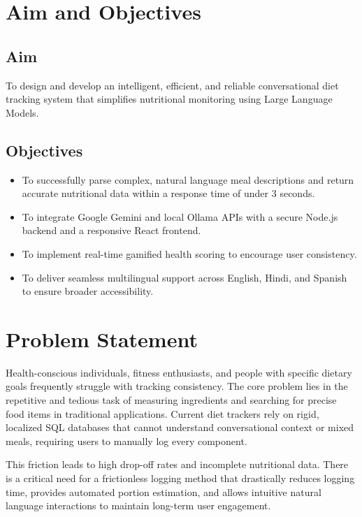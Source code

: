 \documentclass[12pt,a4paper]{report}
\begin{document}
\section{Aim and Objectives}

\subsection{Aim}
To design and develop an intelligent, efficient, and reliable conversational diet tracking system that simplifies nutritional monitoring using Large Language Models.

\subsection{Objectives}
\begin{itemize}[leftmargin=*]
    \item To successfully parse complex, natural language meal descriptions and return accurate nutritional data within a response time of under 3 seconds.
    \item To integrate Google Gemini and local Ollama APIs with a secure Node.js backend and a responsive React frontend.
    \item To implement real-time gamified health scoring to encourage user consistency.
    \item To deliver seamless multilingual support across English, Hindi, and Spanish to ensure broader accessibility.
\end{itemize}

\section{Problem Statement}
Health-conscious individuals, fitness enthusiasts, and people with specific dietary goals frequently struggle with tracking consistency. The core problem lies in the repetitive and tedious task of measuring ingredients and searching for precise food items in traditional applications. Current diet trackers rely on rigid, localized SQL databases that cannot understand conversational context or mixed meals, requiring users to manually log every component. 

This friction leads to high drop-off rates and incomplete nutritional data. There is a critical need for a frictionless logging method that drastically reduces logging time, provides automated portion estimation, and allows intuitive natural language interactions to maintain long-term user engagement.
\end{document}
